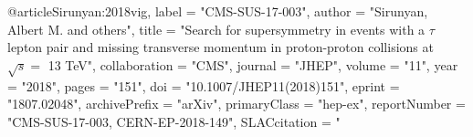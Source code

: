 @article{Sirunyan:2018vig,
      label          = "CMS-SUS-17-003",
      author         = "Sirunyan, Albert M. and others",
      title          = "{Search for supersymmetry in events with a $\tau$ lepton
                        pair and missing transverse momentum in proton-proton
                        collisions at $\sqrt{s} =$ 13 TeV}",
      collaboration  = "CMS",
      journal        = "JHEP",
      volume         = "11",
      year           = "2018",
      pages          = "151",
      doi            = "10.1007/JHEP11(2018)151",
      eprint         = "1807.02048",
      archivePrefix  = "arXiv",
      primaryClass   = "hep-ex",
      reportNumber   = "CMS-SUS-17-003, CERN-EP-2018-149",
      SLACcitation   = "%
}


